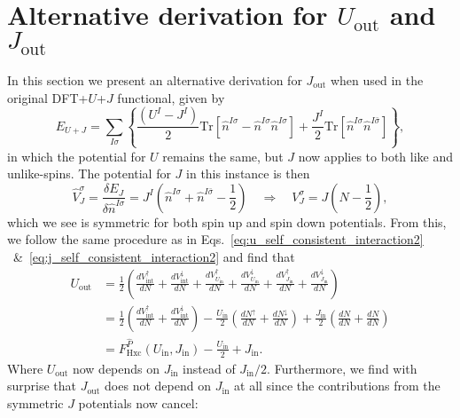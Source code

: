 
\section{Alternative derivation for $U_\textrm{out}$ and $J_\textrm{out}$}

In this section we present an alternative derivation for $J_\textrm{out}$
when used in the original DFT+$U$+$J$ functional,
given by
%
\begin{equation}
E_{U+J}
=\sum_{I\sigma}\left\{\frac{(U^I-J^I)}{2}\mbox{Tr}\left[\hat{n}^{I\sigma}-\hat{n}^{I\sigma}\hat{n}^{I\sigma}\right]
+\frac{J^I}{2}\textrm{Tr}\left[\hat{n}^{I\sigma}\hat{n}^{I\bar\sigma}\right]\right\},
\end{equation}
%
in which the potential for $U$ remains the same, 
but $J$ now applies to both like and unlike-spins.
%
The potential for $J$ in this instance is then
%
\begin{equation}
\hat{V}^\sigma_{J}
=\frac{\delta E_{J}}{\delta \hat{n}^{I\sigma}}
=J^I\left(\hat{n}^{I\sigma}+ \hat{n}^{I\bar\sigma}-\frac{1}{2}\right)
\quad\Rightarrow\quad
{V}^\sigma_{J}=J\left(N-\frac{1}{2}\right),
\end{equation}
%
which we see is symmetric for both 
spin up and spin down potentials.
%
From this, we follow the same procedure as 
in Eqs.~\eqref{eq:u_self_consistent_interaction2} ~\&~\eqref{eq:j_self_consistent_interaction2} 
and find that 
%
\begin{align}
U_\textrm{out}&
=\frac{1}{2}\left(\frac{dV_\textrm{int}^\uparrow}{dN}+\frac{dV_\textrm{int}^\downarrow}{dN}
+\frac{dV_{U_\textrm{in}}^\uparrow}{dN}+\frac{dV_{U_\textrm{in}}^\downarrow}{dN}
+\frac{dV_{J_\textrm{in}}^\uparrow}{dN}+\frac{dV_{J_\textrm{in}}^\downarrow}{dN}\right)
\nonumber \\[10pt]
&=\frac{1}{2}\left(\frac{dV_\textrm{int}^\uparrow}{dN}+\frac{dV_\textrm{int}^\downarrow}{dN}\right)
-\frac{U_\textrm{in}}{2}\left(\frac{dN^\uparrow}{dN}+\frac{dN^\downarrow}{dN}\right)
+\frac{J_\textrm{in}}{2}\left(\frac{dN}{dN}+\frac{dN}{dN}\right)
\nonumber \\[10pt]
&=F_\textrm{Hxc}^{\hat{P}}(U_\textrm{in},J_\textrm{in})-\frac{U_\textrm{in}}{2}+J_\textrm{in}. 
\label{eq:u_self_consistent_interaction3}
\end{align}
%
Where $U_\textrm{out}$ now depends on $J_\textrm{in}$ 
instead of $J_\textrm{in}/2$.
%
Furthermore, 
we find with surprise that $J_\textrm{out}$ 
does not depend on $J_\textrm{in}$ at all 
since the contributions from the symmetric $J$ potentials now cancel:
